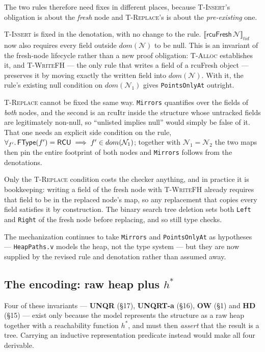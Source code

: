 The two rules therefore need fixes in different places, because \textsc{T-Insert}'s
obligation is about the \emph{fresh} node and \textsc{T-Replace}'s is about the
\emph{pre-existing} one.

\textsc{T-Insert} is fixed in the denotation, with no change to the rule.
$\llbracket \textsf{rcuFresh}\,\mathcal{N} \rrbracket_{tid}$ now also requires every
\RCU{} field outside $dom(\mathcal{N})$ to be \textsf{null}.  This is an invariant of the
fresh-node lifecycle rather than a new proof obligation: \textsc{T-Alloc}
establishes it, and \textsc{T-WriteFH} --- the only rule that writes a field of a
\textsf{rcuFresh} object --- preserves it by moving exactly the written field into
$dom(\mathcal{N})$.  With it, the rule's existing null condition on $dom(\mathcal{N}_1)$ gives
\texttt{PointsOnlyAt} outright.

\textsc{T-Replace} cannot be fixed the same way.  \texttt{Mirrors} quantifies over
the fields of \emph{both} nodes, and the second is an \textsf{rcuItr} inside the
structure whose untracked fields are legitimately non-null, so ``unlisted implies
\textsf{null}'' would simply be false of it.  That one needs an explicit side
condition on the rule, $\forall_{f'} \ldotp \textsf{FType}(f')=\textsf{RCU} \implies f'
\in dom(\mathcal{N}_1)$; together with $\mathcal{N}_1 = \mathcal{N}_2$ the two maps then pin the entire
\RCU{} footprint of both nodes and \texttt{Mirrors} follows from the denotations.

Only the \textsc{T-Replace} condition costs the checker anything, and in practice
it is bookkeeping: writing a field of the fresh node with \textsc{T-WriteFH}
already requires that field to be in the replaced node's map, so any replacement
that copies every \RCU{} field satisfies it by construction.  The binary search
tree deletion sets both \texttt{Left} and \texttt{Right} of the fresh node before
replacing, and so still type checks.

The mechanization continues to take \texttt{Mirrors} and \texttt{PointsOnlyAt} as
hypotheses --- \texttt{HeapPaths.v} models the heap, not the type system --- but
they are now supplied by the revised rule and denotation rather than assumed
away.

\subsection{The encoding: raw heap plus $h^{*}$}
\label{sec:inv-iris}

Four of these invariants --- \textbf{UNQR} (\S17), \textbf{UNQRT-a} (\S16),
\textbf{OW} (\S1) and \textbf{HD} (\S15) --- exist only because the model
represents the structure as a raw heap together with a reachability function
$h^{*}$, and must then \emph{assert} that the result is a tree.  Carrying an
inductive representation predicate instead would make all four derivable.

